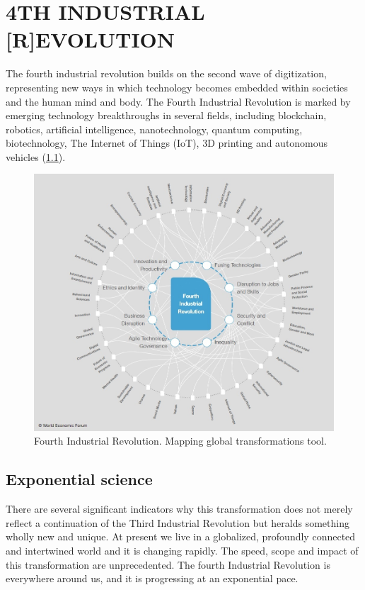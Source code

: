 \chapter{4TH INDUSTRIAL [R]EVOLUTION}
\label{ch:Fourth}

The fourth industrial revolution builds on the second wave of digitization, representing new ways in which technology becomes embedded within societies and the human mind and body. The Fourth Industrial Revolution is marked by emerging technology breakthroughs in several fields, including blockchain, robotics, artificial intelligence, nanotechnology, quantum computing, biotechnology, The Internet of Things (IoT), 3D printing and autonomous vehicles (\cref{fig:mapping global transformation}).

    \begin{figure}
    \centering
    \includegraphics[width=.9\textwidth]{img/ch-revolution/WEF_fourth_industrial_revolution.jpg}
    \caption{Fourth Industrial Revolution. Mapping global transformations tool.}
    \label{fig:mapping global transformation}
    \end{figure}

    
    \section{Exponential science}
    
    There are several significant indicators why this transformation does not merely reflect a continuation of the Third Industrial Revolution but heralds something wholly new and unique. At present we live in a globalized, profoundly connected and intertwined world and it is changing rapidly. The speed, scope and impact of this transformation are unprecedented. The fourth Industrial Revolution is everywhere around us, and it is progressing at an exponential pace.
    
